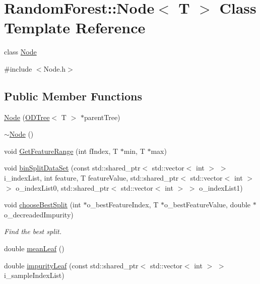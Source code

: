 \hypertarget{class_random_forest_1_1_node}{}\section{Random\+Forest\+:\+:Node$<$ T $>$ Class Template Reference}
\label{class_random_forest_1_1_node}


class \hyperlink{class_random_forest_1_1_node}{Node}  




{\ttfamily \#include $<$Node.\+h$>$}

\subsection*{Public Member Functions}
\begin{DoxyCompactItemize}
\item 
\hyperlink{class_random_forest_1_1_node_a3996771f5b42b9b26c313a63f2fe26b2}{Node} (\hyperlink{class_random_forest_1_1_o_d_tree}{O\+D\+Tree}$<$ T $>$ $\ast$parent\+Tree)
\item 
\hyperlink{class_random_forest_1_1_node_aa34fbfdaa3bb9a2c62d9c9ed1bd5a101}{$\sim$\+Node} ()
\item 
void \hyperlink{class_random_forest_1_1_node_a24884df64c914c6edfc1f937efe151c6}{Get\+Feature\+Range} (int f\+Index, T $\ast$min, T $\ast$max)
\item 
void \hyperlink{class_random_forest_1_1_node_aeb41cbf5e08e8df0cc3079daba5c67d1}{bin\+Split\+Data\+Set} (const std\+::shared\+\_\+ptr$<$ std\+::vector$<$ int $>$ $>$ i\+\_\+index\+List, int feature, T feature\+Value, std\+::shared\+\_\+ptr$<$ std\+::vector$<$ int $>$ $>$ o\+\_\+index\+List0, std\+::shared\+\_\+ptr$<$ std\+::vector$<$ int $>$ $>$ o\+\_\+index\+List1)
\item 
void \hyperlink{class_random_forest_1_1_node_ae9596ccf9ecf94e1c1b27bff947e05f8}{choose\+Best\+Split} (int $\ast$o\+\_\+best\+Feature\+Index, T $\ast$o\+\_\+best\+Feature\+Value, double $\ast$o\+\_\+decreaded\+Impurity)
\begin{DoxyCompactList}\small\item\em Find the best split. \end{DoxyCompactList}\item 
double \hyperlink{class_random_forest_1_1_node_ae6a47546e59805dd886777a40bcd8ef9}{mean\+Leaf} ()
\item 
double \hyperlink{class_random_forest_1_1_node_a3872cc9afe9ce1e85b6ec7f5dcf20a3f}{impurity\+Leaf} (const std\+::shared\+\_\+ptr$<$ std\+::vector$<$ int $>$ $>$ i\+\_\+sample\+Index\+List)

\end{DoxyCompactItemize}
